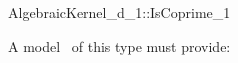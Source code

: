 \begin{ccRefConcept}{AlgebraicKernel_d_1::IsCoprime_1}


A model \ccVar\ of this type must provide:

{}

\ccSeeAlso

\end{ccRefConcept}

